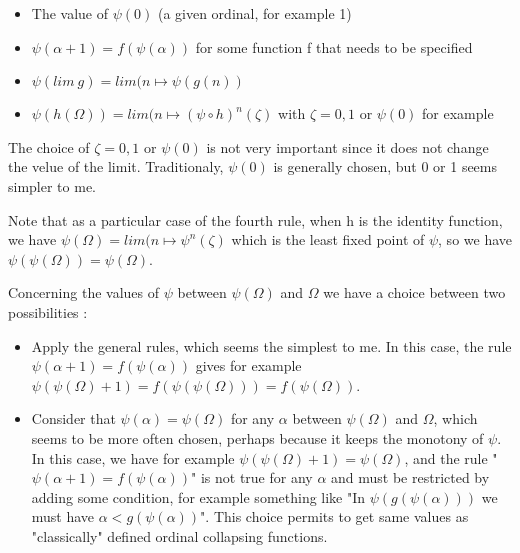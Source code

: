 \documentclass[10pt]{article}
\begin{document}
\begin{itemize}
     \setlength{\itemsep}{1pt}
     \setlength{\parskip}{0pt}
     \setlength{\parsep}{0pt}

\item The value of \( \psi(0) \) (a given ordinal, for example 1)

\item \( \psi(\alpha+1) = f(\psi(\alpha)) \) for some function f that needs to be specified

\item \( \psi(lim\ g) = lim (n \mapsto \psi(g(n)) \)

\item \( \psi(h(\Omega)) = lim (n \mapsto (\psi \circ h)^n(\zeta) \) with \( \zeta = 0, 1 \) or \( \psi(0) \) for example 

\end{itemize}

The choice of \( \zeta = 0, 1 \) or \( \psi(0) \) is not very important since it does not change the velue of the limit. Traditionaly, \( \psi(0) \) is generally chosen, but 0 or 1 seems simpler to me.

Note that as a particular case of the fourth rule, when h is the identity function, we have \( \psi(\Omega) = lim (n \mapsto \psi^n(\zeta) \) which is the least fixed point of \( \psi \), so we have \( \psi(\psi(\Omega)) = \psi(\Omega) \).

Concerning the values of \( \psi \) between \( \psi(\Omega) \) and \( \Omega \) we have a choice between two possibilities : 

\begin{itemize}
     \setlength{\itemsep}{1pt}
     \setlength{\parskip}{0pt}
     \setlength{\parsep}{0pt}

\item Apply the general rules, which seems the simplest to me. In this case, the rule \( \psi(\alpha+1) = f(\psi(\alpha)) \) gives for example \( \psi(\psi(\Omega)+1) = f(\psi(\psi(\Omega))) = f(\psi(\Omega)) \).

\item Consider that \( \psi(\alpha) = \psi(\Omega) \) for any \( \alpha \) between \( \psi(\Omega) \) and \( \Omega \), which seems to be more often chosen, perhaps because it keeps the monotony of \( \psi \). In this case, we have for example \( \psi(\psi(\Omega)+1) = \psi(\Omega) \), and the rule "\( \psi(\alpha+1) = f(\psi(\alpha)) \)" is not true for any \( \alpha \) and must be restricted by adding some condition, for example something like "In \(\psi(g(\psi(\alpha))) \) we must have \( \alpha < g(\psi(\alpha)) \)". This choice permits to get same values as "classically" defined ordinal collapsing functions.

\end{itemize}
\end{document}
